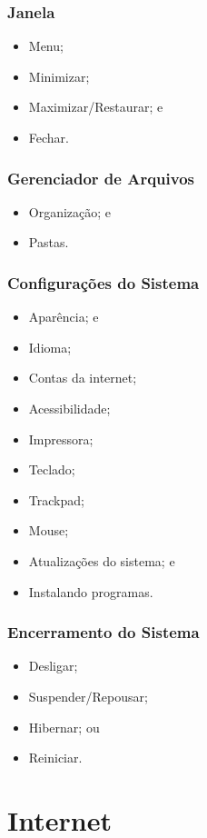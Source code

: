 \documentclass[aspectratio=169]{beamer} %
\begin{document}
\begin{frame}
	\frametitle{Janela}
		
	\begin{itemize}
		\item Menu;
		\item Minimizar;
		\item Maximizar/Restaurar; e
		\item Fechar.
	\end{itemize}
\end{frame}

\begin{frame}
	\frametitle{Gerenciador de Arquivos}
		
	\begin{itemize}
		\item Organiza\c cão; e
		\item Pastas.
	\end{itemize}
\end{frame}

\begin{frame}
	\frametitle{Configura\c cões do Sistema}
		
	\begin{itemize}
		\item Aparência; e
		\item Idioma;
		\item Contas da internet;
		\item Acessibilidade;
		\item Impressora;
		\item Teclado;
		\item Trackpad;
		\item Mouse;
		\item Atualiza\c cões do sistema; e
		\item Instalando programas.
	\end{itemize}
\end{frame}

\begin{frame}
	\frametitle{Encerramento do Sistema}
		
	\begin{itemize}
		\item Desligar;
		\item Suspender/Repousar;
		\item Hibernar; ou
		\item Reiniciar.
	\end{itemize}
\end{frame}


\section{Internet}
\end{document}
